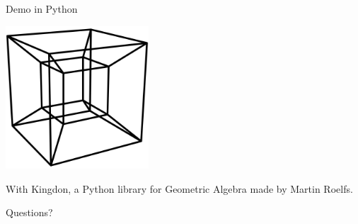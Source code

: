 \begin{frame}{Demo in Python}
    \begin{center}
        \includegraphics[width=0.4\textwidth]{figures/Tesseract_Mark.pdf}
    \end{center}

    With Kingdon, a Python library for Geometric Algebra made by Martin Roelfs.

    \hfill\href{https://tbuli.github.io/teahouse/lab/index.html}{}

\end{frame}


{
\begin{frame}[standout]
    Questions?
\end{frame}
}






